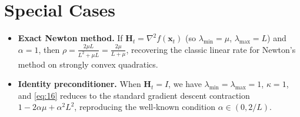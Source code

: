 \documentclass{article}
\newcommand{\Hess}{\nabla^{2}}
\begin{document}
\section*{Special Cases}
\begin{itemize}
\item \textbf{Exact Newton method.}
If $\mathbf H_{t}=\Hess f(\mathbf x_{t})$ (so $\lambda_{\min}=\mu$, $\lambda_{\max}=L$)
and $\alpha=1$, then $\rho= \frac{2\mu L}{L^{2}+ \mu L}= \frac{2\mu}{L+\mu}$,
recovering the classic linear rate for Newton’s method on strongly convex
quadratics.
\item \textbf{Identity preconditioner.}
When $\mathbf H_{t}=I$, we have $\lambda_{\min}=\lambda_{\max}=1$,
$\kappa=1$, and \eqref{eq:16} reduces to the standard gradient descent
contraction $1-2\alpha\mu+ \alpha^{2}L^{2}$, reproducing the well‑known
condition $\alpha\in(0,2/L)$.
\end{itemize}
\end{document}
